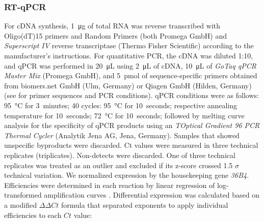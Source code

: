 \subsubsection*{RT-qPCR}
For cDNA synthesis, \SI{1}{\micro\gram} of total RNA was reverse transcribed
with Oligo(dT)15 primers and Random Primers (both Promega GmbH) and
\textit{Superscript IV} reverse transcriptase (Thermo Fisher Scientific)
according to the manufacturer's instructions. For quantitative PCR, the cDNA was
diluted 1:10, and qPCR was performed in \SI{20}{\micro\liter} using
\SI{2}{\micro\liter} of cDNA, \SI{10}{\micro\liter} of \textit{GoTaq qPCR Master
    Mix} (Promega GmbH), and \SI{5}{pmol} of sequence-specific primers obtained from
biomers.net GmbH (Ulm, Germany) or Qiagen GmbH (Hilden, Germany) (see
 for primer sequences and
PCR conditions). qPCR conditions were as follows: \SI{95}{\degreeCelsius} for
\SI{3}{minutes}; 40 cycles: \SI{95}{\degreeCelsius} for \SI{10}{seconds};
respective annealing temperature for \SI{10}{seconds}; \SI{72}{\degreeCelsius}
for \SI{10}{seconds}; followed by melting curve analysis for the specificity of
qPCR products using an \textit{TOptical Gradient 96 PCR Thermal Cycler}
(Analytik Jena AG, Jena, Germany). Samples that showed unspecific byproducts
were discarded. Ct values were measured in three technical replicates
(triplicates). Non-detects were discarded. One of three technical replicates was
treated as an outlier and excluded if its z-score crossed 1.5 $\sigma$ technical
variation. We normalized expression by the housekeeping gene \textit{36B4}.
Efficiencies were determined in each reaction by linear regression of
log-transformed amplification curves
\cite{ramakersAssumptionfreeAnalysisQuantitative2003}. Differential expression
was calculated based on a modified $\Delta\Delta Ct$ formula that separated
exponents to apply individual efficiencies to each $Ct$ value:



